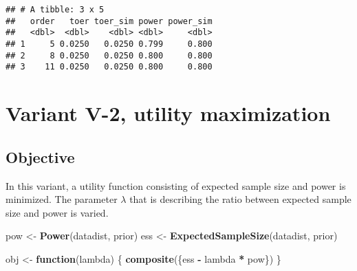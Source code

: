 \documentclass[]{book}
\newenvironment{Shaded}{\begin{snugshade}}{\end{snugshade}}
\newcommand{\ControlFlowTok}[1]{\textcolor[rgb]{0.13,0.29,0.53}{\textbf{#1}}}
\newcommand{\DecValTok}[1]{\textcolor[rgb]{0.00,0.00,0.81}{#1}}
\newcommand{\KeywordTok}[1]{\textcolor[rgb]{0.13,0.29,0.53}{\textbf{#1}}}
\newcommand{\NormalTok}[1]{#1}
\newcommand{\OperatorTok}[1]{\textcolor[rgb]{0.81,0.36,0.00}{\textbf{#1}}}
\newcommand{\StringTok}[1]{\textcolor[rgb]{0.31,0.60,0.02}{#1}}
\begin{document}
\begin{Shaded}
\begin{Highlighting}[]
{{{{\NormalTok{  testthat}\OperatorTok{::}\KeywordTok{expect_true}\NormalTok{(}\KeywordTok{all}\NormalTok{(.}\OperatorTok{$}\NormalTok{power     }\OperatorTok{>=}\StringTok{ }\NormalTok{min_power }\OperatorTok{*}\StringTok{ }\NormalTok{(}\DecValTok{1} \OperatorTok{-}\StringTok{ }\NormalTok{tol)))}
\NormalTok{  testthat}\OperatorTok{::}\KeywordTok{expect_true}\NormalTok{(}\KeywordTok{all}\NormalTok{(.}\OperatorTok{$}\NormalTok{power_sim }\OperatorTok{>=}\StringTok{ }\NormalTok{min_power }\OperatorTok{*}\StringTok{ }\NormalTok{(}\DecValTok{1} \OperatorTok{-}\StringTok{ }\NormalTok{tol))) \}}
\end{Highlighting}
\end{Shaded}

\begin{verbatim}
## # A tibble: 3 x 5
##   order   toer toer_sim power power_sim
##   <dbl>  <dbl>    <dbl> <dbl>     <dbl>
## 1     5 0.0250   0.0250 0.799     0.800
## 2     8 0.0250   0.0250 0.800     0.800
## 3    11 0.0250   0.0250 0.800     0.800
\end{verbatim}

\hypertarget{variantV_2}{%
\section{Variant V-2, utility maximization}\label{variantV_2}}

\hypertarget{objective-11}{%
\subsection{Objective}\label{objective-11}}

In this variant, a utility function consisting of expected sample size and
power is minimized.
The parameter \(\lambda\) that is describing the ratio between expected
sample size and power is varied.

\begin{Shaded}
\begin{Highlighting}[]
\NormalTok{pow <-}\StringTok{ }\KeywordTok{Power}\NormalTok{(datadist, prior)}
\NormalTok{ess <-}\StringTok{ }\KeywordTok{ExpectedSampleSize}\NormalTok{(datadist, prior)}

\NormalTok{obj <-}\StringTok{ }\ControlFlowTok{function}\NormalTok{(lambda) \{}
  \KeywordTok{composite}\NormalTok{(\{ess }\OperatorTok{-}\StringTok{ }\NormalTok{lambda }\OperatorTok{*}\StringTok{ }\NormalTok{pow\})}
\NormalTok{\}}
\end{Highlighting}
\end{Shaded}
\end{document}
